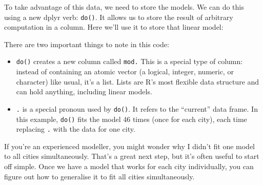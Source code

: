 To take advantage of this data, we need to store the models. We can do
this using a new dplyr verb: \texttt{do()}. It allows us to store the
result of arbitrary computation in a column. Here we'll use it to store
that linear model: 

\begin{Shaded}
\end{Shaded}

There are two important things to note in this code:

\begin{itemize}
\item
  \texttt{do()} creates a new column called \texttt{mod.} This is a
  special type of column: instead of containing an atomic vector (a
  logical, integer, numeric, or character) like usual, it's a list.
  Lists are R's most flexible data structure and can hold anything,
  including linear models.
\item
  \texttt{.} is a special pronoun used by \texttt{do()}. It refers to
  the ``current'' data frame. In this example, \texttt{do()} fits the
  model 46 times (once for each city), each time replacing \texttt{.}
  with the data for one city. 
\end{itemize}

If you're an experienced modeller, you might wonder why I didn't fit one
model to all cities simultaneously. That's a great next step, but it's
often useful to start off simple. Once we have a model that works for
each city individually, you can figure out how to generalise it to fit
all cities simultaneously.

